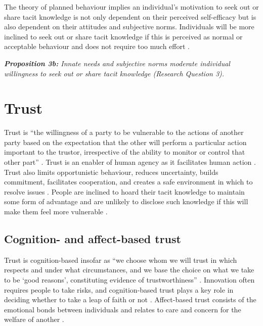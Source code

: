 The theory of planned behaviour implies an individual's motivation to seek out or share tacit knowledge is not only dependent on their perceived self-efficacy but is also dependent on their attitudes and subjective norms. Individuals will be more inclined to seek out or share tacit knowledge if this is perceived as normal or acceptable behaviour and does not require too much effort \citep{gagne2009model,chen2012behavioral}. \bigskip

\begin{tcolorbox}
\textit{\textbf{Proposition 3b:} Innate needs and subjective norms moderate individual willingness to seek out or share tacit knowledge (Research Question 3).}
\end{tcolorbox}

\section{Trust}

Trust is \enquote{the willingness of a party to be vulnerable to the actions of another party based on the expectation that the other will perform a particular action important to the trustor, irrespective of the ability to monitor or control that other part} \citep{mayer1995integrative}. 
Trust is an enabler of human agency as it facilitates human action \citep{muller2008living,mcevily2011measuring}. Trust also limits opportunistic behaviour, reduces uncertainty, builds commitment, facilitates cooperation, and creates a safe environment in which to resolve issues \citep{nonaka1994dynamic,panteli2005trust,rasmussen2007work}. People are inclined to hoard their tacit knowledge to maintain some form of advantage and are unlikely to disclose such knowledge if this will make them feel more vulnerable  \citep{levin2004strength,kankanhalli2005contributing,riege2005three,lin2007share,milne2007motivation,alsharo2017virtual}. 

\subsection{Cognition- and affect\hyp{}based trust}

Trust is cognition-based insofar as \enquote{we choose whom we will trust in which respects and under what circumstances, and we base the choice on what we take to be \enquote{good reasons}, constituting evidence of trustworthiness} \citep{lewis1985trust}. Innovation often requires people to take risks, and cognition\hyp{}based trust plays a key role in deciding whether to take a leap of faith or not \citep{mcevily2011measuring}. Affect-based trust consists of the emotional bonds between individuals and relates to care and concern for the welfare of another \citep{mcallister1995affect}. \medskip


